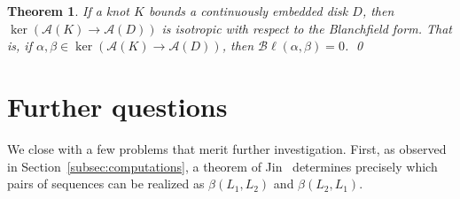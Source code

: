 \documentclass[a4paper, 11pt]{amsart}
\newtheorem{theorem}{Theorem}[section]
\theoremstyle{definition}
\newcommand{\Bl}{\mathcal{B}\ell}
\begin{document}
\begin{theorem}\label{thm: ker is isotropic}
If a knot $K$ bounds a continuously embedded disk $D$, then
$\ker(\mathcal{A}(K)\to \mathcal{A}(D))$ is isotropic with respect to the
Blanchfield form. That is, if
$\alpha,\beta\in \ker(\mathcal{A}(K)\to \mathcal{A}(D))$, then
$\Bl(\alpha,\beta)=0$. \qed
\end{theorem}




\section{Further questions}\label{sect: problems}
We close with a few problems that merit further investigation. First, as observed in Section~\ref{subsec:computations}, a theorem of Jin~\cite[Theorem~3.5]{Jin91} determines precisely which pairs of sequences can be realized as $\beta(L_1,L_2)$ and $\beta(L_2,L_1)$.
\end{document}
